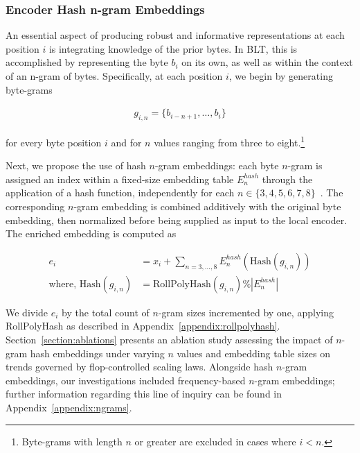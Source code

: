 \subsubsection{Encoder Hash n-gram Embeddings}
\label{sec:ngram-emb}
\label{sec:hash-emb}
An essential aspect of producing robust and informative representations at each position $i$ is integrating knowledge of the prior bytes. In {\textsc BLT}, this is accomplished by representing the byte $b_i$ on its own, as well as within the context of an n-gram of bytes. Specifically, at each position $i$, we begin by generating byte-grams

\begin{align}
    g_{i,n}=\{b_{i-n + 1},\ldots, b_i\}
\end{align}

for every byte position $i$ and for $n$ values ranging from three to eight.\footnote{
Byte-grams with length $n$ or greater are excluded in cases where $i < n$. }

Next, we propose the use of hash $n$-gram embeddings: each byte $n$-gram is assigned an index within a fixed-size embedding table $E_{n}^{hash}$ through the application of a hash function, independently for each $n \in\{3,4,5,6,7,8\}$~\citep{bai2010learning}.
The corresponding $n$-gram embedding is combined additively with the original byte embedding, then normalized before being supplied as input to the local encoder. The enriched embedding is computed as

\begin{align}
e_i &= x_i + \sum_{n = 3,...,8}E_{n}^{hash}(\text{Hash}(g_{i,n})) \\
\text{where, Hash}(g_{i,n}) &= \text{RollPolyHash}(g_{i,n}) \% |E_{n}^{hash}|
\end{align}

We divide $e_i$ by the total count of $n$-gram sizes incremented by one, applying RollPolyHash as described in Appendix~\ref{appendix:rollpolyhash}. Section~\ref{section:ablations} presents an ablation study assessing the impact of $n$-gram hash embeddings under varying $n$ values and embedding table sizes on trends governed by flop-controlled scaling laws. Alongside hash $n$-gram embeddings, our investigations included frequency-based $n$-gram embeddings; further information regarding this line of inquiry can be found in Appendix~\ref{appendix:ngrams}.

